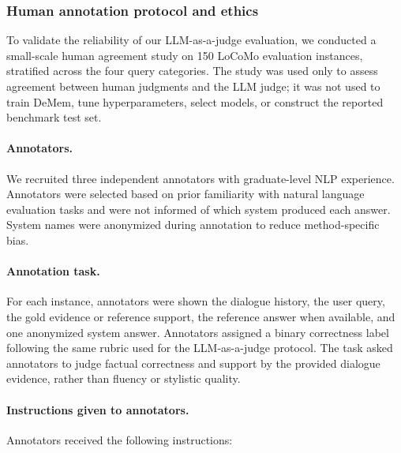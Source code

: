 \documentclass{article}
\theoremstyle{plain}
\theoremstyle{definition}
\theoremstyle{remark}
\begin{document}
\subsubsection{Human annotation protocol and ethics}
\label{app:human_annotation_ethics}

To validate the reliability of our LLM-as-a-judge evaluation, we conducted a small-scale human agreement study on 150 LoCoMo evaluation instances, stratified across the four query categories. The study was used only to assess agreement between human judgments and the LLM judge; it was not used to train DeMem, tune hyperparameters, select models, or construct the reported benchmark test set.

\paragraph{Annotators.}
We recruited three independent annotators with graduate-level NLP experience. Annotators were selected based on prior familiarity with natural language evaluation tasks and were not informed of which system produced each answer. System names were anonymized during annotation to reduce method-specific bias.

\paragraph{Annotation task.}
For each instance, annotators were shown the dialogue history, the user query, the gold evidence or reference support, the reference answer when available, and one anonymized system answer. Annotators assigned a binary correctness label following the same rubric used for the LLM-as-a-judge protocol. The task asked annotators to judge factual correctness and support by the provided dialogue evidence, rather than fluency or stylistic quality.

\paragraph{Instructions given to annotators.}
Annotators received the following instructions:
\end{document}
